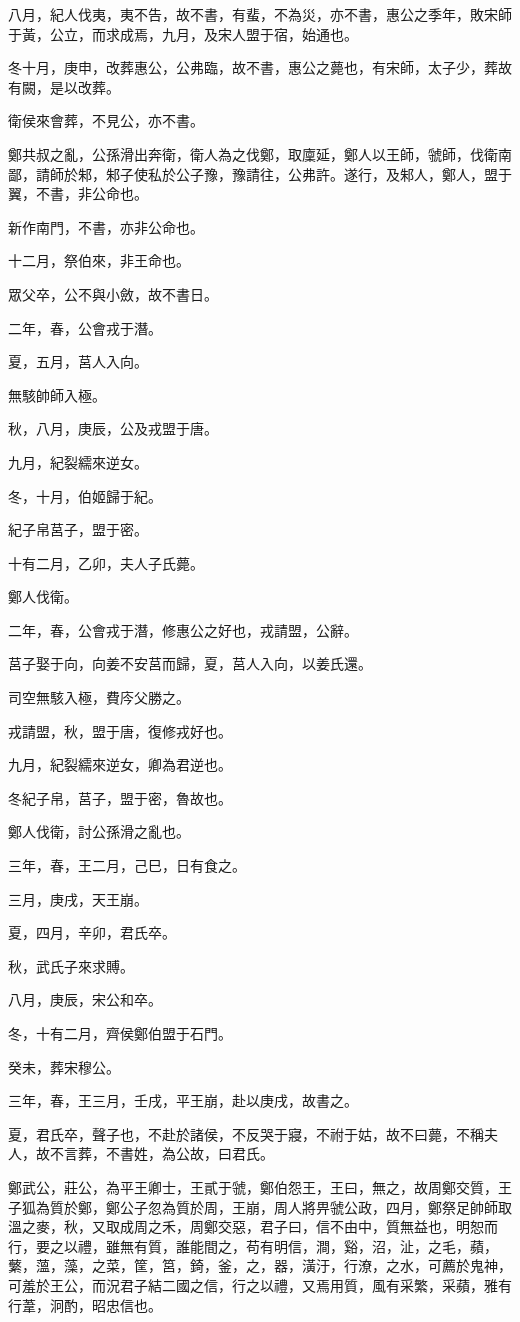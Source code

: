 \begin{pinyinscope}
八月，紀人伐夷，夷不告，故不書，有蜚，不為災，亦不書，惠公之季年，敗宋師于黃，公立，而求成焉，九月，及宋人盟于宿，始通也。

冬十月，庚申，改葬惠公，公弗臨，故不書，惠公之薨也，有宋師，太子少，葬故有闕，是以改葬。

衛侯來會葬，不見公，亦不書。

鄭共叔之亂，公孫滑出奔衛，衛人為之伐鄭，取廩延，鄭人以王師，虢師，伐衛南鄙，請師於邾，邾子使私於公子豫，豫請往，公弗許。遂行，及邾人，鄭人，盟于翼，不書，非公命也。

新作南門，不書，亦非公命也。

十二月，祭伯來，非王命也。

眾父卒，公不與小斂，故不書日。

二年，春，公會戎于潛。

夏，五月，莒人入向。

無駭帥師入極。

秋，八月，庚辰，公及戎盟于唐。

九月，紀裂繻來逆女。

冬，十月，伯姬歸于紀。

紀子帛莒子，盟于密。

十有二月，乙卯，夫人子氏薨。

鄭人伐衛。

二年，春，公會戎于潛，修惠公之好也，戎請盟，公辭。

莒子娶于向，向姜不安莒而歸，夏，莒人入向，以姜氏還。

司空無駭入極，費庈父勝之。

戎請盟，秋，盟于唐，復修戎好也。

九月，紀裂繻來逆女，卿為君逆也。

冬紀子帛，莒子，盟于密，魯故也。

鄭人伐衛，討公孫滑之亂也。

三年，春，王二月，己巳，日有食之。

三月，庚戌，天王崩。

夏，四月，辛卯，君氏卒。

秋，武氏子來求賻。

八月，庚辰，宋公和卒。

冬，十有二月，齊侯鄭伯盟于石門。

癸未，葬宋穆公。

三年，春，王三月，壬戌，平王崩，赴以庚戌，故書之。

夏，君氏卒，聲子也，不赴於諸侯，不反哭于寢，不祔于姑，故不曰薨，不稱夫人，故不言葬，不書姓，為公故，曰君氏。

鄭武公，莊公，為平王卿士，王貳于虢，鄭伯怨王，王曰，無之，故周鄭交質，王子狐為質於鄭，鄭公子忽為質於周，王崩，周人將畀虢公政，四月，鄭祭足帥師取溫之麥，秋，又取成周之禾，周鄭交惡，君子曰，信不由中，質無益也，明恕而行，要之以禮，雖無有質，誰能間之，苟有明信，澗，谿，沼，沚，之毛，蘋，蘩，薀，藻，之菜，筐，筥，錡，釜，之，器，潢汙，行潦，之水，可薦於鬼神，可羞於王公，而況君子結二國之信，行之以禮，又焉用質，風有采繁，采蘋，雅有行葦，泂酌，昭忠信也。


\end{pinyinscope}

